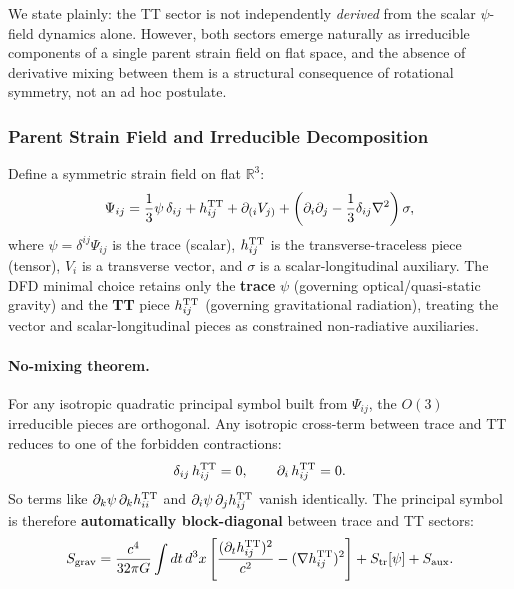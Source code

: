 We state plainly: the TT sector is not independently \textit{derived} from the scalar $\psi$-field dynamics alone.  However, both sectors emerge naturally as irreducible components of a single parent strain field on flat space, and the absence of derivative mixing between them is a structural consequence of rotational symmetry, not an ad hoc postulate.

\subsubsection{Parent Strain Field and Irreducible Decomposition}\label{sec:gw-parent}

Define a symmetric strain field on flat $\mathbb{R}^3$:
\begin{equation}\label{eq:parent-strain}
\Psi_{ij} = \frac{1}{3}\psi\,\delta_{ij} + h_{ij}^{\rm TT} + \partial_{(i}V_{j)} + \left(\partial_i\partial_j - \frac{1}{3}\delta_{ij}\nabla^2\right)\sigma,
\end{equation}
where $\psi = \delta^{ij}\Psi_{ij}$ is the trace (scalar), $h_{ij}^{\rm TT}$ is the transverse-traceless piece (tensor), $V_i$ is a transverse vector, and $\sigma$ is a scalar-longitudinal auxiliary.  The DFD minimal choice retains only the \textbf{trace} $\psi$ (governing optical/quasi-static gravity) and the \textbf{TT} piece $h_{ij}^{\rm TT}$ (governing gravitational radiation), treating the vector and scalar-longitudinal pieces as constrained non-radiative auxiliaries.

\paragraph{No-mixing theorem.}
For any isotropic quadratic principal symbol built from $\Psi_{ij}$, the $O(3)$ irreducible pieces are orthogonal.  Any isotropic cross-term between trace and TT reduces to one of the forbidden contractions:
\begin{equation}
\delta_{ij}\,h_{ij}^{\rm TT} = 0, \qquad \partial_i\,h_{ij}^{\rm TT} = 0.
\end{equation}
So terms like $\partial_k\psi\,\partial_k h_{ii}^{\rm TT}$ and $\partial_i\psi\,\partial_j h_{ij}^{\rm TT}$ vanish identically.  The principal symbol is therefore \textbf{automatically block-diagonal} between trace and TT sectors:
\begin{equation}\label{eq:S-block}
S_{\rm grav} = \frac{c^4}{32\pi G}\int dt\,d^3x\left[\frac{(\partial_t h_{ij}^{\rm TT})^2}{c^2} - (\nabla h_{ij}^{\rm TT})^2\right] + S_{\rm tr}[\psi] + S_{\rm aux}.
\end{equation}


